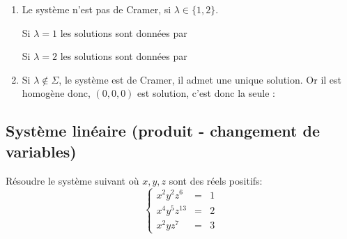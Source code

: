 \begin{correction}
\begin{enumerate}
\item Le système n'est pas de Cramer, si $\lambda\in \{1,2\}$.

Si $\lambda=1$ les solutions sont données par 

Si $\lambda=2$ les solutions sont données par 

\item Si $\lambda\notin \Sigma$, le système est de Cramer, il admet une unique solution. Or il est homogène donc, $(0,0,0)$ est solution, c'est donc la seule :
\end{enumerate}
\end{correction}


\subsection{Système linéaire (produit - changement de variables)}

\begin{exercice}
Résoudre le système suivant où $x,y,z$ sont des réels positifs: 
$$\left\{ \begin{array}{ccc}
x^2y^2z^6 & =& 1\\
x^4y^5z^{13}& =& 2 \\
x^2yz^7 & =& 3
\end{array}\right. $$
\end{exercice}

